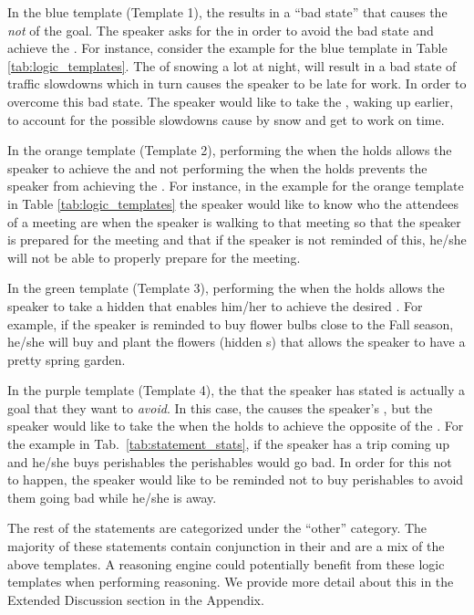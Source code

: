 In the blue template (Template 1), the \textState results in a ``bad state'' that causes the \emph{not} of the goal. The speaker asks for the \textAction in order to avoid the bad state and achieve the \textGoal. For instance, consider the example for the blue template in Table \ref{tab:logic_templates}. The \textState of snowing a lot at night, will result in a bad state of traffic slowdowns which in turn causes the speaker to be late for work. In order to overcome this bad state. The speaker would like to take the \textAction, waking up earlier, to account for the possible slowdowns cause by snow and get to work on time.

In the orange template (Template 2), performing the \textAction when the \textState holds allows the speaker to achieve the \textGoal and not performing the \textAction when the \textState holds prevents the speaker from achieving the \textGoal. For instance, in the example for the orange template in Table \ref{tab:logic_templates} the speaker would like to know who the attendees of a meeting are when the speaker is walking to that meeting so that the speaker is prepared for the meeting and that if the speaker is not reminded of this, he/she will not be able to properly prepare for the meeting. 

In the green template (Template 3), performing the \textAction when the \textState holds allows the speaker to take a hidden \textAction that enables him/her to achieve the desired \textGoal. For example, if the speaker is reminded to buy flower bulbs close to the Fall season, he/she will buy and plant the flowers (hidden \textAction s) that allows the speaker to have a pretty spring garden.

In the purple template (Template 4), the \textGoal that the speaker has stated is actually a goal that they want to \emph{avoid}. In this case, the \textState causes the speaker's \textGoal, but the speaker would like to take the \textAction when the \textState holds to achieve the opposite of the \textGoal. For the example in Tab.~\ref{tab:statement_stats}, if the speaker has a trip coming up and he/she buys perishables the perishables would go bad. In order for this not to happen, the speaker would like to be reminded not to buy perishables to avoid them going bad while he/she is away. 

The rest of the statements are categorized under the ``other'' category. The majority of these statements contain conjunction in their \textState and are a mix of the above templates. 
A reasoning engine could potentially benefit from these logic templates when performing reasoning. We provide more detail about this in the Extended Discussion section in the Appendix. 

